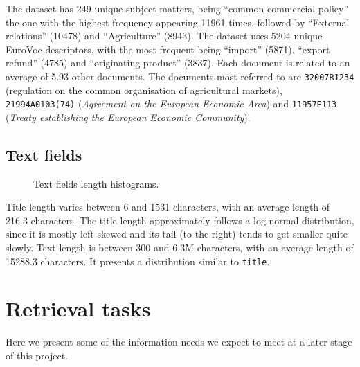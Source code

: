 \documentclass[sigconf, authorversion]{acmart}
\begin{document}
The dataset has 249 unique subject matters, being ``common commercial policy'' the one with the highest frequency appearing \SI{11961}{} times, followed by ``External relations'' (\SI{10478}{}) and ``Agriculture'' (\SI{8943}{}).
The dataset uses \SI{5204}{} unique EuroVoc descriptors, with the most frequent being ``import''  (\SI{5871}{}), ``export refund'' (\SI{4785}{}) and ``originating product'' (\SI{3837}{}).
Each document is related to an average of 5.93 other documents. The documents most referred to are \texttt{32007R1234} (regulation on the common organisation of agricultural markets), \texttt{21994A0103(74)} (\textit{Agreement on the European Economic Area}) and \texttt{11957E113} (\textit{Treaty establishing the European Economic Community}).

\subsection{Text fields}

\begin{figure}[ht]
    \centering
    \begin{minipage}[t]{0.5\linewidth}
        \centering
        
    \end{minipage}%
    \begin{minipage}[t]{0.5\linewidth}
        \centering
        
    \end{minipage}
    \caption{Text fields length histograms.}
\end{figure}

Title length varies between 6 and \SI{1531}{} characters, with an average length of 216.3 characters. The title length approximately follows a log-normal distribution, since it is mostly left-skewed and its tail (to the right) tends to get smaller quite slowly.
Text length is between 300 and 6.3M characters, with an average length of 15288.3 characters. It presents a distribution similar to \texttt{title}.

\section{Retrieval tasks}
\label{sec:retrieval tasks}

Here we present some of the information needs we expect to meet at a later stage of this project.
\end{document}
